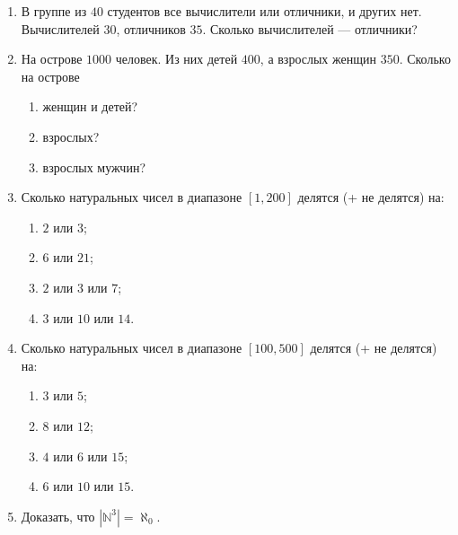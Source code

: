 \begin{enumerate}
    \item В группе из $40$ студентов все вычислители или отличники, и других нет. Вычислителей $30$, отличников $35$. Сколько вычислителей --- отличники?

    \item На острове $1000$ человек. Из них детей $400$, а взрослых женщин $350$. Сколько на острове 
    \begin{enumerate}
        \item женщин и детей?
        \item взрослых?
        \item взрослых мужчин?
    \end{enumerate}

    \item Сколько натуральных чисел в диапазоне $[1,200]$ делятся (+ не делятся) на:
    \begin{enumerate}
        \item $2$ или $3$;
        \item $6$ или $21$;
        \item $2$ или $3$ или $7$;
        \item $3$ или $10$ или $14$.
    \end{enumerate}
    
    \item Сколько натуральных чисел в диапазоне $[100,500]$ делятся (+ не делятся) на:
    \begin{enumerate}
        \item $3$ или $5$;
        \item $8$ или $12$;
        \item $4$ или $6$ или $15$;
        \item $6$ или $10$ или $15$.
    \end{enumerate}
    
    \item Доказать, что $|\mathbb{N}^3|=\aleph_0$.
    

\end{enumerate}
